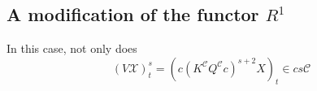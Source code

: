 \documentclass[11pt]{amsart} \renewcommand{\baselinestretch}{1.2}
\theoremstyle{plain}
\newtheorem{prop}[thm]{Proposition}
\numberwithin{equation}{section} %
\theoremstyle{plain}
\newtheorem{prop}[thm]{Proposition}
\numberwithin{equation}{chapter} %
\renewcommand{\ker}{\mathrm{ker}\,}
\renewcommand{\to}{\longrightarrow}
\newcommand{\scrC}{\mathscr{C}}
\newcommand{\calV}{\mathcal{V}}
\newcommand{\calx}{\mathcal{X}}
\newcommand{\calc}{\mathcal{C}}
\newcommand{\citeBOX}[2][]{\cite[\mbox{#1}]{#2}}
\newcommand{\vect}[2]{\calV^{#1}_{#2}}
\newcommand{\algs}{{\scrC\!\textit{\normalfont\textit{om}}}}
\newcommand{\Dendo}{R}
\newcommand{\SubsectionOrSection}[1]{\subsection{#1}}
\begin{document}
\begin{Operations on the Bousfield-Kan spectral sequence}
%
%
%
%
\SubsectionOrSection{A modification of the functor $\Dendo^1$}
In this case, not only does
\[(V\calx)^s_t=(c(K^{\calc}Q^{\calc}c)^{s+2}X)_t\in cs\calc\]

\end{Operations on the Bousfield-Kan spectral sequence}
\end{document}
